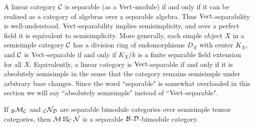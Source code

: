 \documentclass{amsart}
\begin{document}
A linear category $\mathcal C$ is separable (as a $\mathrm{Vect}$-module) if and only if it can be realized as a category of algebras over a separable algebra.  Thus $\mathrm{Vect}$-separability is well-understood.   $\mathrm{Vect}$-separability implies semisimplicity, and over a perfect field it is equivalent to semisimplicity.  More generally, each simple object $X$ in a semisimple category $\mathcal C$ has a division ring of endomorphisms $D_X$ with center $K_X$, and $\mathcal C$ is $\mathrm{Vect}$-separable if and only if $K_X/k$ is a finite separable field extension for all $X$.  Equivalently, a linear category is $\mathrm{Vect}$-separable if and only if it is absolutely semisimple in the sense that the category remains semisimple under arbitrary base changes.  Since the word ``separable" is somewhat overloaded in this section we will say ``absolutely semisimple" instead of ``$\mathrm{Vect}$-separable".  

\begin{theorem} \label{thm:compositeOfSep}
	If ${}_\mathcal B\mathcal M_\mathcal C$ and ${}_\mathcal C\mathcal N_\mathcal D$ are separable bimodule categories over semisimple tensor categories, then $\mathcal M \boxtimes_{\mathcal C} \mathcal N$ is a separable $\mathcal B$-$\mathcal D$-bimodule category.
\end{theorem}
\end{document}
